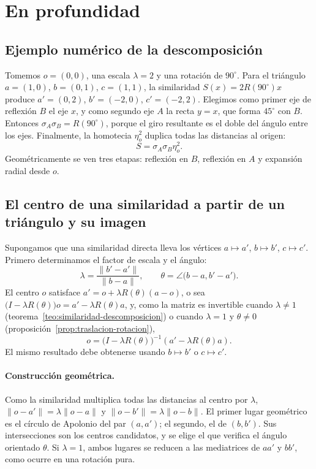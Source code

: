 \section{En profundidad}

\subsection{Ejemplo numérico de la descomposición}

\begin{ejemplo}\label{ej:descomposicion-similaridad}
Tomemos \(o=(0,0)\), una escala \(\lambda=2\) y una rotación de \(90^\circ\). Para el
triángulo \(a=(1,0)\), \(b=(0,1)\), \(c=(1,1)\), la similaridad \(S(x)=2R(90^\circ)x\) produce
\(a'=(0,2)\), \(b'=(-2,0)\), \(c'=(-2,2)\). Elegimos como primer eje de reflexión \(B\) el eje
\(x\), y como segundo eje \(A\) la recta \(y=x\), que forma \(45^\circ\) con \(B\). Entonces
\(\sigma_A\sigma_B=R(90^\circ)\), porque el giro resultante es el doble del ángulo entre los
ejes. Finalmente, la homotecia \(\eta_o^2\) duplica todas las distancias al origen:
\[
  \boxed{S=\sigma_A\sigma_B\eta_o^2}.
\]
Geométricamente se ven tres etapas: reflexión en \(B\), reflexión en \(A\) y expansión radial
desde \(o\).
\end{ejemplo}

\subsection{El centro de una similaridad a partir de un triángulo y su imagen}

Supongamos que una similaridad directa lleva los vértices \(a\mapsto a'\), \(b\mapsto b'\),
\(c\mapsto c'\). Primero determinamos el factor de escala y el ángulo:
\[
  \lambda=\frac{\lVert b'-a'\rVert}{\lVert b-a\rVert},
  \qquad
  \theta=\angle\bigl(b-a,b'-a'\bigr).
\]
El centro \(o\) satisface \(a'=o+\lambda R(\theta)(a-o)\), o sea
\(\bigl(I-\lambda R(\theta)\bigr)o=a'-\lambda R(\theta)a\), y, como la matriz es invertible cuando \(\lambda\neq1\)
(teorema~\ref{teo:similaridad-descomposicion}) o cuando \(\lambda=1\) y \(\theta\neq0\)
(proposición~\ref{prop:traslacion-rotacion}),
\[
  \boxed{
  o=
  \bigl(I-\lambda R(\theta)\bigr)^{-1}
  \left(a'-\lambda R(\theta)a\right)
  }.
\]
El mismo resultado debe obtenerse usando \(b\mapsto b'\) o \(c\mapsto c'\).

\paragraph{Construcción geométrica.}
Como la similaridad multiplica todas las distancias al centro por \(\lambda\),
\(\lVert o-a'\rVert=\lambda\lVert o-a\rVert\) y \(\lVert o-b'\rVert=\lambda\lVert o-b\rVert\). El primer lugar geométrico es el círculo de Apolonio del par \((a,a')\); el segundo, el de
\((b,b')\). Sus intersecciones son los centros candidatos, y se elige el que verifica el
ángulo orientado \(\theta\). Si \(\lambda=1\), ambos lugares se
reducen a las mediatrices de \(aa'\) y \(bb'\), como ocurre en una rotación pura.

